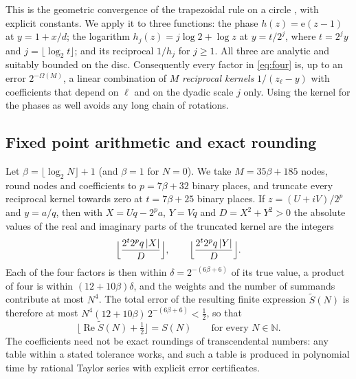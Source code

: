 \documentclass[11pt]{amsart}
\theoremstyle{remark}
\newcommand{\N}{\mathbb{N}}
\newcommand{\e}{\mathrm{e}}
\DeclareMathOperator{\re}{Re}
\begin{document}
This is the geometric convergence of the trapezoidal rule on a circle
\cite{TW}, with explicit constants.  We apply it to three functions: the
phase $h(z)=\e(z-1)$ at $y=1+x/d$; the logarithm
$h_j(z)=j\log2+\log z$ at $y=t/2^{j}$, where $t=2^jy$ and
$j=\lfloor\log_2t\rfloor$; and its reciprocal $1/h_j$ for $j\ge1$.  All
three are analytic and suitably bounded on the disc.  Consequently every
factor in \eqref{eq:four} is, up to an error $2^{-\Omega(M)}$, a linear
combination of $M$ \emph{reciprocal kernels} $1/(z_\ell-y)$ with coefficients
that depend on $\ell$ and on the dyadic scale $j$ only.  Using the kernel for
the phases as well avoids any long chain of rotations.

\subsection{Fixed point arithmetic and exact rounding}
Let $\beta=\lfloor\log_2N\rfloor+1$ (and $\beta=1$ for $N=0$).  We take
$M=35\beta+185$ nodes, round nodes and coefficients to $p=7\beta+32$ binary
places, and truncate every reciprocal kernel towards zero at $t=7\beta+25$
binary places.  If $z=(U+iV)/2^p$ and $y=a/q$, then
with $X=Uq-2^pa$, $Y=Vq$ and $D=X^2+Y^2>0$ the absolute values of the real
and imaginary parts of the truncated kernel are the integers
\begin{equation}\label{eq:quot}
  \Bigl\lfloor\frac{2^{t}2^{p}q\,|X|}{D}\Bigr\rfloor,\qquad
  \Bigl\lfloor\frac{2^{t}2^{p}q\,|Y|}{D}\Bigr\rfloor .
\end{equation}
Each of the four factors is then within $\delta=2^{-(6\beta+6)}$ of its true
value, a product of four is within $(12+10\beta)\delta$, and the weights and
the number of summands contribute at most $N^4$.  The total error of the
resulting finite expression $\widetilde S(N)$ is therefore at most
$N^4(12+10\beta)\,2^{-(6\beta+6)}<\tfrac12$, so that
\[
  \bigl\lfloor\re\widetilde S(N)+\tfrac12\bigr\rfloor=S(N)
  \qquad\text{for every }N\in\N .
\]
The coefficients need not be exact roundings of transcendental numbers: any
table within a stated tolerance works, and such a table is produced in
polynomial time by rational Taylor series with explicit error certificates.
\end{document}

